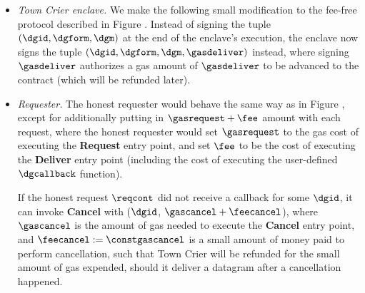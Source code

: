 \begin{itemize}[leftmargin=5mm]
\item
{\it Town Crier enclave.}
We make the following small modification to the fee-free protocol
described in Figure .
Instead of signing the tuple $(\dgid, \dgform, \dgm)$
at the end of the enclave's execution, the enclave now signs 
the tuple $(\dgid, \dgform, \dgm, \gasdeliver)$
instead, where signing 
$\gasdeliver$ authorizes a
gas amount of $\gasdeliver$ to be advanced
to the contract (which will be refunded later).
\item
{\it Requester.}
The honest requester would behave the same way as in Figure ,
except for additionally putting 
in $\gasrequest + \fee$ 
amount with each request, 
where the honest 
requester would set  
$\gasrequest$
to the gas cost of executing the  
{\bf Request} entry point,
and set $\fee$ to be the cost 
of executing the {\bf Deliver} entry point (including
the cost of executing the user-defined $\dgcallback$ function).

If the honest request $\reqcont$ did not receive
a callback for some $\dgid$,  
it can invoke {\bf Cancel}
with ($\dgid$, $\gascancel + \feecancel$),
where $\gascancel$ is the amount of gas needed 
to execute the {\bf Cancel} entry point, and $\feecancel := \constgascancel$
is a small amount of money paid to perform cancellation, 
such that Town Crier will be refunded for the small amount of gas expended,
should it deliver a datagram after a cancellation happened.

\end{itemize}


